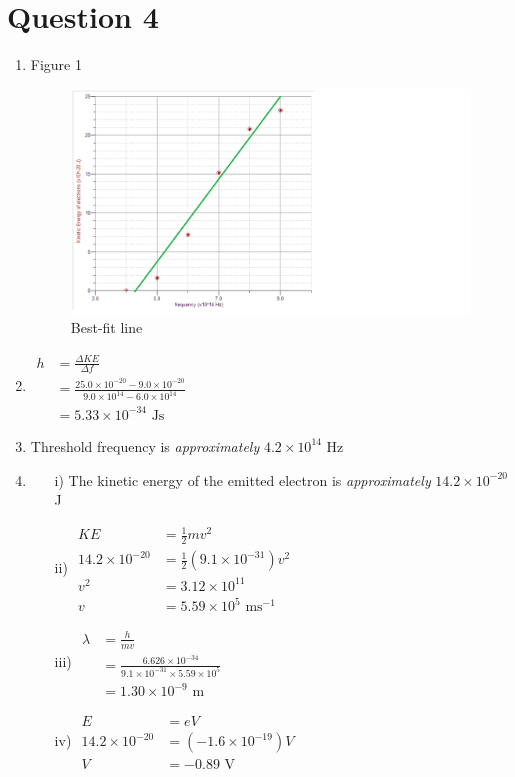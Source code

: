 \documentclass[a4paper, fleqn]{article}
\begin{document}
\pagebreak

\section{Question 4}
\begin{enumerate}[label=(\alph{*})]
\item Figure 1\\
\begin{figure}[h!]
\includegraphics[width=\linewidth]{assets/201801310030.png}
\caption{Best-fit line}
\label{fig:graph1}
\end{figure}

\item $\begin{aligned}h&=\frac{\Delta KE}{\Delta f}\\&=\frac{25.0\times10^{-20}-9.0\times10^{-20}}{9.0\times10^{14}-6.0\times10^{14}}\\&=5.33\times10^{-34}\text{ Js}\end{aligned}$
\item Threshold frequency is \textit{approximately} $4.2\times10^{14}$ Hz
\item \begin{enumerate}
\item[i)] The kinetic energy of the emitted electron is \textit{approximately} $14.2\times10^{-20}$ J
\item[ii)] $\begin{aligned}KE&=\frac{1}{2}mv^2\\14.2\times10^{-20}&=\frac{1}{2}(9.1\times10^{-31})v^2\\v^2&=3.12\times10^{11}\\v&=5.59\times10^5\text{ ms}^{-1}\end{aligned}$
\item[iii)] $\begin{aligned}\lambda&=\frac{h}{mv}\\&=\frac{6.626\times10^{-34}}{9.1\times10^{-31}\times5.59\times10^5}\\&=1.30\times10^{-9}\text{ m}\end{aligned}$
\item[iv)] $\begin{aligned}E&=eV\\14.2\times10^{-20}&=(-1.6\times10^{-19})V\\V&=-0.89\text{ V}\end{aligned}$
\end{enumerate}
\end{enumerate}
\end{document}
